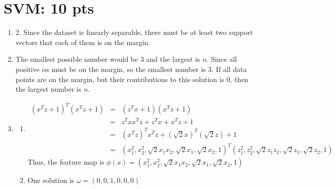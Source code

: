 \documentclass[12pt]{article}
\begin{document}
\section{SVM: 10 pts}
\begin{enumerate}
\item 2. Since the dataset is linearly separable, there must be at least two support vectors that each of them is on the margin.
\item The smallest possible number would be 3 and the largest is $n$. Since all positive $\alpha$s must be on the margin, so the smallest number is 3.
      If all data points are on the margin, but their contributions to this solution is 0, then the largest number is $n$.
\item \begin{enumerate}
    \item \begin{eqnarray}
        (x^{T}z+1)^{T}(x^{T}z+1) &=& (z^{T}x+1)(x^{T}z+1) \nonumber
        \\ &=& z^{T}xx^{T}z + z^{T}x + x^{T}z + 1 \nonumber
        \\ &=& (x^{T}z)^{T}x^{T}z + (\sqrt{2} x)^{T}(\sqrt{2} z) + 1 \nonumber
        \\ &=& (x_{1}^{2}, x_{2}^{2}, \sqrt{2}x_{1}x_{2}, \sqrt{2}x_{1}, \sqrt{2}x_{2}, 1)^{T} (z_{1}^{2}, z_{2}^{2}, \sqrt{2}z_{1}z_{2}, \sqrt{2}z_{1}, \sqrt{2}z_{2}, 1) \nonumber
    \end{eqnarray}
    Thus, the feature map is $\phi(x) = (x_{1}^{2}, x_{2}^{2}, \sqrt{2}x_{1}x_{2}, \sqrt{2}x_{1}, \sqrt{2}x_{2}, 1)$
    \item One solution is $\omega = (0, 0, 1, 0, 0, 0)$
\end{enumerate}

\end{enumerate}
\end{document}
